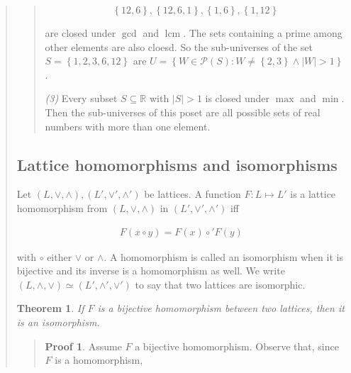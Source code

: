 \documentclass[a4paper, 12pt]{article}
\newtheorem{theorem}{Theorem}
\theoremstyle{definition}
\theoremstyle{definition}
\theoremstyle{definition}
\newtheorem{pro}{Proof}
\DeclareMathOperator{\lcm}{lcm}
\begin{document}
\begin{quote}
\begin{quote}
    \begin{equation*}
        \left\{ 12, 6 \right\}, \left\{ 12, 6, 1 \right\}, \left\{ 1, 6 \right\}, \left\{ 1, 12 \right\} 
    \end{equation*}

    are closed under $\gcd$ and $\lcm$. The sets containing a prime among other
    elements are also cloesd. So the sub-universes of the set $S = \left\{ 1,
    2, 3,6,12 \right\} $ are $U = \left\{ W \in \mathcal{P}(S) : W \neq \left\{
    2,3 \right\} \land  |W| > 1  \right\} $.

    \textit{(3)} Every subset $S \subseteq \mathbb{R}$ with $|S| > 1$ is 
    closed under $\max$ and $\min$. Then the sub-universes of this 
    poset are all possible sets of real numbers with more than one 
    element.



\end{quote}
\normalsize


\subsection{Lattice homomorphisms and isomorphisms}

Let $(L, \lor, \land), (L', \lor', \land')$ be lattices. A function $F : L
\mapsto L'$ is a lattice homomorphism from $(L, \lor, \land)$ in $(L', \lor',
\land')$ iff 

\begin{align*}
    F(x \circ y) = F(x) \circ' F(y)
\end{align*}

with $\circ$ either $\lor$ or $\land$. A homomorphism is called an isomorphism
when it is bijective and its inverse is a homomorphism as well. We write $(L,
\land, \lor)
\simeq (L', \land', \lor') $ to say that two lattices are isomorphic.

\begin{theorem}
    If $F$ is a bijective homomorphism between two lattices, then it is an
    isomorphism. 
\end{theorem}


\small
\begin{quote}

    \begin{pro}
 Assume $F$ a bijective homomorphism. Observe that, since 
$F$ is a homomorphism,


\end{pro}
\end{quote}
\end{quote}
\end{document}
